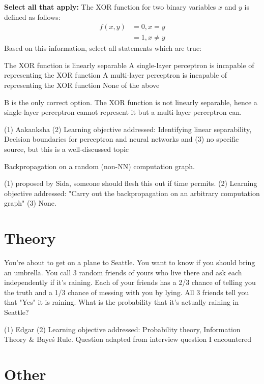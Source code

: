 \begin{questions}
    \question \textbf{Select all that apply:} The XOR function for two binary variables $x$ and $y$ is defined as follows:
\begin{equation*}
    \begin{split}
        f(x,y) & = 0, x = y \\
        & = 1, x \neq y
    \end{split}
\end{equation*}
Based on this information, select all statements which are true:
    {%
    \checkboxchar{$\Box$} %
    \begin{checkboxes}
     \choice The XOR function is linearly separable
     \choice A single-layer perceptron is incapable of representing the XOR function
     \choice A multi-layer perceptron is incapable of representing the XOR function
     \choice None of the above
    \end{checkboxes}
    }
    \begin{soln}
    B is the only correct option. The XOR function is not linearly separable, hence a single-layer perceptron cannot represent it but a multi-layer perceptron can.\\
    \end{soln}
    \begin{qauthor}
    (1) Aakanksha (2) Learning objective addressed: Identifying linear separability, Decision boundaries for perceptron and neural networks and (3) no specific source, but this is a well-discussed topic
    \end{qauthor}
    
    \question Backpropagation on a random (non-NN) computation graph.
    
    \begin{qauthor}
    (1) proposed by Sida, someone should flesh this out if time permits. (2) Learning objective addressed: "Carry out the backpropagation on an arbitrary computation graph" (3) None.
    \end{qauthor}
    
\end{questions}

\section{Theory}
\begin{questions}
\question


 \begin{qauthor}
    You're about to get on a plane to Seattle. You want to know  if you should bring an umbrella. You call 3 random friends of yours who live there and ask each independently if it's raining. Each of your friends has a 2/3 chance of telling you the truth and a 1/3 chance of messing with you by lying. All 3 friends tell you that "Yes" it is raining. What is the probability that it's actually raining in Seattle?
    
    (1) Edgar (2) Learning objective addressed: Probability theory, Information Theory & Baye\'s Rule.  Question adapted from interview question I encountered
    \end{qauthor}
\end{questions}

\section{Other}
\begin{questions}
\question
\end{questions}
